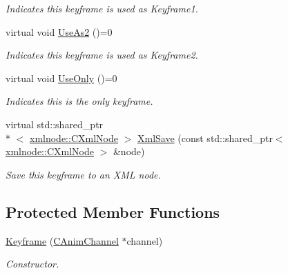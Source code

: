 \begin{DoxyCompactItemize}
\begin{DoxyCompactList}\small\item\em Indicates this keyframe is used as Keyframe1. \end{DoxyCompactList}\item 
\hypertarget{class_c_anim_channel_1_1_keyframe_acee82565971cf385abbc94c4fd29c6a5}{virtual void \hyperlink{class_c_anim_channel_1_1_keyframe_acee82565971cf385abbc94c4fd29c6a5}{Use\+As2} ()=0}\label{class_c_anim_channel_1_1_keyframe_acee82565971cf385abbc94c4fd29c6a5}

\begin{DoxyCompactList}\small\item\em Indicates this keyframe is used as Keyframe2. \end{DoxyCompactList}\item 
\hypertarget{class_c_anim_channel_1_1_keyframe_a70a183c3caabf9b820d41cae4d5fa5ae}{virtual void \hyperlink{class_c_anim_channel_1_1_keyframe_a70a183c3caabf9b820d41cae4d5fa5ae}{Use\+Only} ()=0}\label{class_c_anim_channel_1_1_keyframe_a70a183c3caabf9b820d41cae4d5fa5ae}

\begin{DoxyCompactList}\small\item\em Indicates this is the only keyframe. \end{DoxyCompactList}\item 
virtual std\+::shared\+\_\+ptr\\*
$<$ \hyperlink{classxmlnode_1_1_c_xml_node}{xmlnode\+::\+C\+Xml\+Node} $>$ \hyperlink{class_c_anim_channel_1_1_keyframe_a2dbc0b264510a45b9a429f64aa2d8448}{Xml\+Save} (const std\+::shared\+\_\+ptr$<$ \hyperlink{classxmlnode_1_1_c_xml_node}{xmlnode\+::\+C\+Xml\+Node} $>$ \&node)
\begin{DoxyCompactList}\small\item\em Save this keyframe to an X\+M\+L node. \end{DoxyCompactList}\end{DoxyCompactItemize}
\subsection*{Protected Member Functions}
\begin{DoxyCompactItemize}
\item 
\hyperlink{class_c_anim_channel_1_1_keyframe_a123c8c5557957a1202d9987fce83b31e}{Keyframe} (\hyperlink{class_c_anim_channel}{C\+Anim\+Channel} $\ast$channel)
\begin{DoxyCompactList}\small\item\em Constructor. \end{DoxyCompactList}\end{DoxyCompactItemize}
